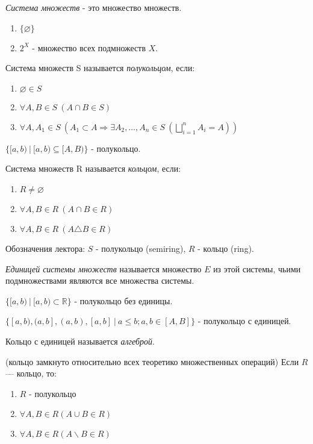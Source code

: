 \Def \textit{Система множеств} - это множество множеств.

\Examples
\begin{enumerate}
    \item $\{\varnothing\}$
    \item $2^X$ - множество всех подмножеств $X$.
\end{enumerate}

\Def Система множеств S называется \textit{полукольцом}, если:

\begin{enumerate} 
    \item $\varnothing \in S$
    \item $\forall A, B \in S \ (A \cap B \in S)$
    \item $\forall A, A_1 \in S \ (A_1 \subset A \Rightarrow \exists A_2, \dots, A_n \in S \ (\bigsqcup_{i = 1}^{n} A_i = A))$
\end{enumerate} 

\Example $\{[a, b)\ |\ [a, b) \subseteq [A, B)\}$ - полукольцо.

\Def Система множеств R называется \textit{кольцом}, если:

\begin{enumerate} 
    \item $R \neq \varnothing$
    \item $\forall A, B \in R\ (A \cap B \in R)$
    \item $\forall A, B \in R\ (A \triangle B \in R)$
\end{enumerate} 

Обозначения лектора: $S$ - полукольцо (semiring), $R$ - кольцо (ring).

\Def \textit{Единицей системы множеств} называется множество $E$ из этой системы, чьими подмножествами являются все множества системы.

\Example $\{[a, b)\ |\ [a, b) \subset \mathbb{R}\}$ - полукольцо без единицы.

\Example $\{[a, b), (a, b], (a, b), [a, b]\ |\ a \leq b; a, b \in [A, B] \}$ - полукольцо с единицей.


\Def Кольцо с единицей называется \textit{алгеброй}.

\Statement (кольцо замкнуто относительно всех теоретико множественных операций) Если $R$ — кольцо, то:

\begin{enumerate} 
    \item $R$ - полукольцо
    \item $\forall A, B \in R (A \cup B \in R)$
    \item $\forall A, B \in R (A \backslash B \in R)$
\end{enumerate} 

